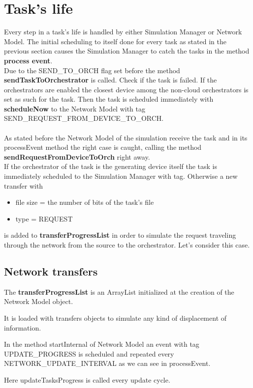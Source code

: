 \documentclass[12pt]{report}
\begin{document}
\section{Task's life}
Every step in a task's life is handled by either Simulation Manager or Network Model.
The initial scheduling to itself done for every task as stated in the previous section causes the Simulation Manager to catch the tasks in the method \textbf{process event}.\\
Due to the SEND\_TO\_ORCH flag set before the method \textbf{sendTaskToOrchestrator} is called.
Check if the task is failed.
If the orchestrators are enabled the closest device among the non-cloud orchestrators is set as such for the task.
Then the task is scheduled immediately with \textbf{scheduleNow} to the Network Model with tag SEND\_REQUEST\_FROM\_DEVICE\_TO\_ORCH.\\
\\
As stated before the Network Model of the simulation receive the task and in its processEvent method the right case is caught, calling the method \textbf{sendRequestFromDeviceToOrch} right away.\\
If the orchestrator of the task is the generating device itself 
the task is immediately scheduled to the Simulation Manager with  tag.
Otherwise a new transfer with
\begin{itemize}
	\item file size = the number of bits of the task's file
	\item type = REQUEST
\end{itemize}
is added to \textbf{transferProgressList} in order to simulate the request traveling through the network from the source to the orchestrator. Let's consider this case.\\

\subsection*{Network transfers}
The \textbf{transferProgressList} is an ArrayList initialized at the creation of the Network Model object.

It is loaded with transfers objects to simulate any kind of displacement of information.

In the method startInternal of Network Model an event with tag UPDATE\_PROGRESS is scheduled and repeated every NETWORK\_UPDATE\_INTERVAL as we can see in processEvent.

Here updateTasksProgress is called every update cycle.
\end{document}
